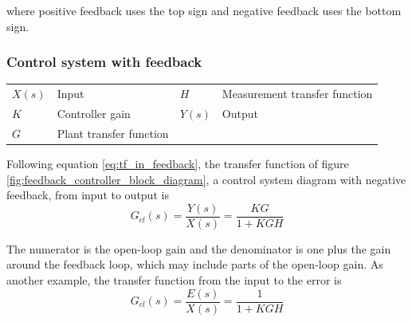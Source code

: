 where positive feedback uses the top sign and negative feedback uses the bottom
sign.

\subsubsection{Control system with feedback}
\begin{bookfigure}

  \caption{Feedback controller block diagram}
  \label{fig:feedback_controller_block_diagram}
  \begin{figurekey}
    \begin{tabular}{llll}
      $X(s)$ & Input & $H$ & Measurement transfer function \\
      $K$ & Controller gain & $Y(s)$ & Output \\
      $G$ & Plant transfer function & & \\
    \end{tabular}
  \end{figurekey}
\end{bookfigure}

Following equation \eqref{eq:tf_in_feedback}, the transfer function of figure
\ref{fig:feedback_controller_block_diagram}, a \gls{control system} diagram with
negative feedback, from input to output is
\begin{equation}
  G_{cl}(s) = \frac{Y(s)}{X(s)} = \frac{KG}{1 + KGH}
\end{equation}

The numerator is the \gls{open-loop gain} and the denominator is one plus the
gain around the feedback loop, which may include parts of the
\gls{open-loop gain}. As another example, the transfer function from the input
to the \gls{error} is
\begin{equation}
  G_{cl}(s) = \frac{E(s)}{X(s)} = \frac{1}{1 + KGH}
\end{equation}

